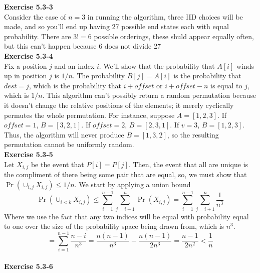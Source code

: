 \documentclass{article}
\begin{document}
\noindent\textbf{Exercise 5.3-3}\\

Consider the case of $n=3$ in running the algorithm, three IID choices will be made, and so you'll end up having 27 possible end states each with equal probability. There are $3!=6$ possible orderings, these shuld appear equally often, but this can't happen because 6 does not divide 27\\

\noindent\textbf{Exercise 5.3-4}\\

Fix a position $j$ and an index $i$.  We'll show that the probability that $A[i]$ winds up in position $j$ is $1/n$.  The probability $B[j] = A[i]$ is the probability that $dest = j$, which is the probability that $i + o\!f\!\!f\!set$ or $i + o\!f\!\!f\!set - n$ is equal to $j$, which is $1/n$.  This algorithm can't possibly return a random permutation because it doesn't change the relative positions of the elements; it merely cyclically permutes the whole permutation.  For instance, suppose $A = [1,2,3]$.  If $o\!f\!\!f\!set = 1$, $B = [3,2,1]$.  If $o\!f\!\!f\!set = 2$, $B = [2,3,1]$.  If $v = 3$, $B = [1,2,3]$.  Thus, the algorithm will never produce $B = [1,3,2]$, so the resulting permutation cannot be uniformly random. \\

\noindent\textbf{Exercise 5.3-5}\\

Let $X_{i,j}$ be the event that $P[i] = P[j]$. Then, the event that all are unique is the compliment of there being some pair that are equal, so, we must show that $\Pr(\cup_{i,j} X_{i,j}) \le 1/n$. We start by applying a union bound
\[
\Pr(\cup_{i<k} X_{i,j}) \le \sum_{i=1}^{n-1} \sum_{j=i+1}^n \Pr(X_{i,j}) = \sum_{i=1}^{n-1} \sum_{j=i+1}^n \frac{1}{n^3}
\]
Where we use the fact that any two indices will be equal with probability equal to one over the size of the probability space being drawn from, which is $n^3$.
\[
 = \sum_{i=1}^{n-1} \frac{n-i}{n^3} = \frac{n(n-1)}{n^3} - \frac{n(n-1)}{2n^3} = \frac{n-1}{2n^2} < \frac{1}{n}
\]\\

\noindent\textbf{Exercise 5.3-6}\\
\end{document}
